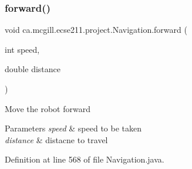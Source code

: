 \subsubsection{\texorpdfstring{forward()}{forward()}}
{\footnotesize\ttfamily void ca.\+mcgill.\+ecse211.\+project.\+Navigation.\+forward (\begin{DoxyParamCaption}\item[{int}]{speed,  }\item[{double}]{distance }\end{DoxyParamCaption})}

Move the robot forward


\begin{DoxyParams}{Parameters}
{\em speed} & speed to be taken \\
\hline
{\em distance} & distacne to travel \\
\hline
\end{DoxyParams}


Definition at line 568 of file Navigation.\+java.


